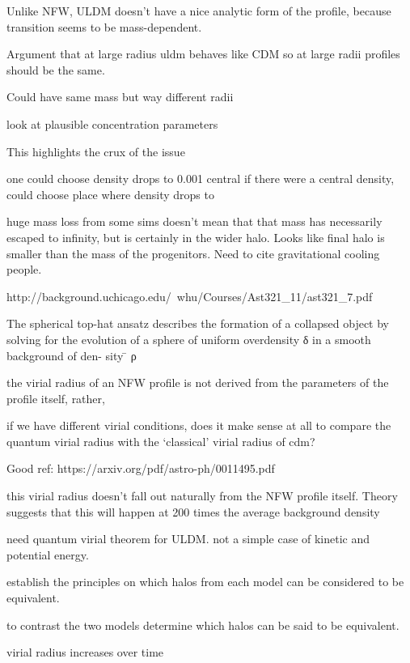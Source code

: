 \documentclass[a4paper,11pt]{article}
\begin{document}
Unlike NFW, ULDM doesn't have a nice analytic form of the profile, because transition seems to be mass-dependent. 



Argument that at large radius uldm behaves like CDM so at large radii profiles should be the same. 



Could have same mass but way different radii

look at plausible concentration parameters



This highlights the crux of the issue 


one could choose density drops to 0.001 central if there were a central density, could choose place where density drops to 





huge mass loss from some sims doesn't mean that that mass has necessarily escaped to infinity, but is certainly in the wider halo. Looks like final halo is smaller than the mass of the progenitors. Need to cite gravitational cooling people.


http://background.uchicago.edu/~whu/Courses/Ast321_11/ast321_7.pdf

The spherical top-hat ansatz describes the formation of
a collapsed object by solving for the evolution of a sphere
of uniform overdensity
δ
in a smooth background of den-
sity  ̄
ρ


the virial radius of an NFW profile is not derived from the parameters of the profile itself, rather, 




if we have different virial conditions, does it make sense at all to compare the quantum virial radius with the `classical' virial radius of cdm?


Good ref: https://arxiv.org/pdf/astro-ph/0011495.pdf

this virial radius doesn't fall out naturally from the NFW profile itself. Theory suggests that this will happen at 200 times the average background density

need quantum virial theorem for ULDM. not a simple case of kinetic and potential energy. 


establish the principles on which halos from each model can be considered to be equivalent. 

to contrast the two models determine which halos can be said to be equivalent.


virial radius increases over time
\end{document}
